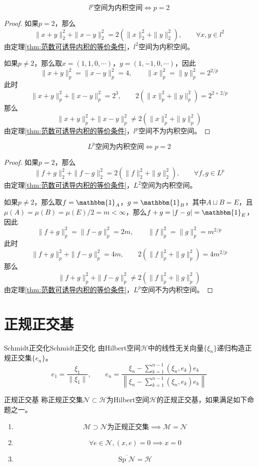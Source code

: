 \documentclass[lang = cn, scheme = chinese, thmcnt = section]{elegantbook}
\newcommand{\sub}{\subset}             %
\begin{document}
\begin{proposition}
	$$
	l^p\text{空间为内积空间}\iff p=2
	$$
\end{proposition}

\begin{proof}
	如果$p=2$​，那么
	$$
	\|x+y\|_2^2+\|x-y\|_2^2=2(\|x\|_2^2+\|y\|_2^2),\qquad \forall x,y\in l^2
	$$
	由定理\ref{thm:范数可诱导内积的等价条件}，$l^2$空间为内积空间。
	
	如果$p\ne 2$，那么取$x=(1,1,0,\cdots)$，$y=(1,-1,0,\cdots)$​，因此
	$$
	\|x+y\|_p^2=\|x-y\|_p^2=4,\qquad 
	\|x\|_p^2=\|y\|_p^2=2^{2/p}
	$$
	此时
	$$
	\|x+y\|_p^2+\|x-y\|_p^2=2^3,\qquad 
	2(\|x\|_p^2+\|y\|_p^2)=2^{2+2/p}
	$$
	那么
	$$
	\|x+y\|_p^2+\|x-y\|_p^2\ne 
	2(\|x\|_p^2+\|y\|_p^2)
	$$
	由定理\ref{thm:范数可诱导内积的等价条件}，$l^p$空间不为内积空间。
\end{proof}

\begin{proposition}
	$$
	L^p\text{空间为内积空间}\iff p=2
	$$
\end{proposition}

\begin{proof}
	如果$p=2$​，那么
	$$
	\|f+g\|_2^2+\|f-g\|_2^2=2(\|f\|_2^2+\|g\|_2^2),\qquad \forall f,g\in L^p
	$$
	由定理\ref{thm:范数可诱导内积的等价条件}，$L^2$空间为内积空间。
	
	如果$p\ne 2$，那么取$f=\mathbbm{1}_A$，$g=\mathbbm{1}_B$，其中$A\sqcup B=E$，且$\mu(A)=\mu(B)=\mu(E)/2=m<\infty$，那么$f+g=|f-g|=\mathbbm{1}_E$，因此
	$$
	\|f+g\|_p^2=\|f-g\|_p^2=2m,\qquad 
	\|f\|_p^2=\|g\|_p^2=m^{2/p}
	$$
	此时
	$$
	\|f+g\|_p^2+\|f-g\|_p^2=4m,\qquad
	2(\|f\|_p^2+\|g\|_p^2)=4m^{2/p}
	$$
	那么
	$$
	\|f+g\|_p^2+\|f-g\|_p^2\ne
	2(\|f\|_p^2+\|g\|_p^2)
	$$
	由定理\ref{thm:范数可诱导内积的等价条件}，$L^p$空间不为内积空间。
\end{proof}

\section{正规正交基}

\begin{theorem}{Schmidt正交化}{Schmidt正交化}
	由Hilbert空间$\mathcal{H}$中的线性无关向量$\{ \xi_n \}$递归构造正规正交集$\{e_n\}$。
	$$
	e_1=\frac{\xi_1}{\|\xi_1\|},\qquad 
	e_{n}=\frac{\displaystyle \xi_n-\sum_{k=1}^{n-1}(\xi_n,e_{k})e_k}{\displaystyle \left\| \xi_n-\sum_{k=1}^{n-1}(\xi_n,e_{k})e_k \right\|}
	$$
\end{theorem}

\begin{definition}{正规正交基}
	称正规正交集$\mathcal{N}\sub \mathcal{H}$为Hilbert空间$\mathcal{H}$的正规正交基，如果满足如下命题之一。
	\begin{enumerate}
		\item 
		$$
		\mathcal{M}\supset\mathcal{N}\text{为正规正交集}\implies\mathcal{M}=\mathcal{N}
		$$
		\item 
		$$
		\forall e\in\mathcal{N},(x,e)=0\implies x=0
		$$
		\item 
		$$
		\overline{\text{Sp }\mathcal{N}}=\mathcal{H}
		$$
	\end{enumerate}
\end{definition}
\end{document}
